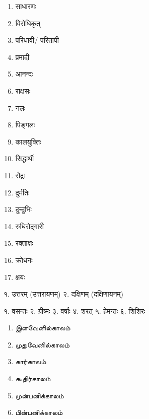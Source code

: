 \begin{multicols}{3}
\begin{enumerate}
    \item साधारणः
    \item विरोधिकृत्
    \item परिधावी/ परितापी
    \item प्रमादी
    \item आनन्दः
    \item राक्षसः
    \item नलः
    \item पिङ्गलः
    \item कालयुक्तिः
    \item सिद्धार्थी
    \item रौद्रः
    \item दुर्मतिः
    \item दुन्दुभिः
    \item रुधिरोद्गारी
    \item रक्ताक्षः
    \item क्रोधनः
    \item क्षयः
  \end{enumerate}
\end{multicols}

१. उत्तरम् (उत्तरायणम्)\hspace{2em}
२. दक्षिणम् (दक्षिणायनम्)



१. वसन्तः २. ग्रीष्मः
३. वर्षाः ४. शरत्
५. हेमन्तः ६. शिशिरः

\tamfamily
{}
\nopagebreak[4]

\begin{multicols}{2}
  \renewcommand{\labelenumi}{\theenumi.}
  \begin{enumerate}\itemsep-1ex
    \item இளவேனில்காலம்
    \item  முதுவேனில்காலம்
    \item  கார்காலம்
    \item  கூதிர்காலம்
    \item  முன்பனிக்காலம்
    \item  பின்பனிக்காலம்
  \end{enumerate}
\end{multicols}

\dngfamily



